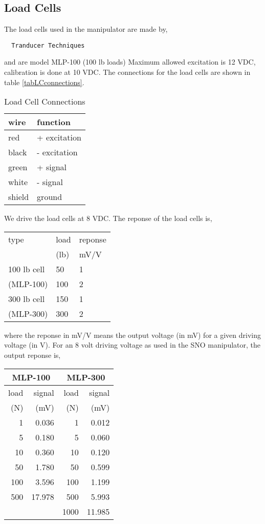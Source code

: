 \subsection{Load Cells}
The load cells used in the manipulator are made by,
\begin{verbatim}
  Tranducer Techniques
\end{verbatim}
and are model MLP-100 (100 lb loads)
Maximum allowed excitation is 12 VDC, calibration is done at 10 VDC.
The connections for the load cells are shown in table \ref{tabLCconnections}.
\begin{table}[htb]
\begin{center}
\begin{tabular}{l|l}
wire & function\\ \hline
red  & + excitation\\
black & - excitation\\
green & + signal\\
white & - signal\\
shield & ground\\
\end{tabular}
\caption[Load Cells]
        {Load Cell Connections
        }
\end{center}
\end{table}
We drive the load cells at 8 VDC.  The reponse of the load cells is,
\begin{center}
\begin{tabular}{lll}
type        &  load   & reponse \\
            &  (lb)   & mV/V    \\
\hline
100 lb cell & 50    & 1 \\
(MLP-100) & 100   & 2 \\
\hline
300 lb cell & 150 & 1 \\
(MLP-300)   & 300 & 2 \\
\hline
\end{tabular}
\end{center}
where the reponse in mV/V means the output voltage (in mV) for a given
driving voltage (in V).
For an 8 volt driving voltage as used in the SNO manipulator, the
output reponse is,
\begin{center}
\begin{tabular}{|rr|rr|}
\hline
\multicolumn{2}{|c|}{MLP-100} &\multicolumn{2}{|c|}{MLP-300} \\ 
\hline
load & signal &  load & signal \\
(N)  & (mV)   &  (N)  & (mV)  \\
\hline
 1   &  0.036 &    1  &  0.012 \\
 5   &  0.180 &    5  &  0.060 \\
10   &  0.360 &   10  &  0.120 \\
50   &  1.780 &   50  &  0.599 \\
100  &  3.596 &  100  &  1.199 \\
500  & 17.978 &  500  &  5.993 \\
     &        & 1000  & 11.985 \\
\hline
\end{tabular}
\end{center}
